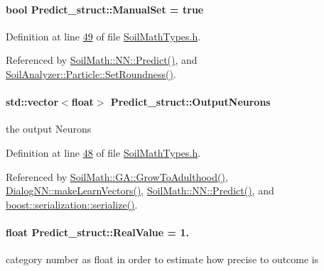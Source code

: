 \hypertarget{struct_predict__struct_a9e16b308d69246f0954a4a9100fc0660}{}
\paragraph[{Manual\+Set}]{\setlength{\rightskip}{0pt plus 5cm}bool Predict\+\_\+struct\+::\+Manual\+Set = true}\label{struct_predict__struct_a9e16b308d69246f0954a4a9100fc0660}


Definition at line \hyperlink{_soil_math_types_8h_source_l00049}{49} of file \hyperlink{_soil_math_types_8h_source}{Soil\+Math\+Types.\+h}.



Referenced by \hyperlink{_n_n_8cpp_source_l00056}{Soil\+Math\+::\+N\+N\+::\+Predict()}, and \hyperlink{particle_8cpp_source_l00089}{Soil\+Analyzer\+::\+Particle\+::\+Set\+Roundness()}.

\hypertarget{struct_predict__struct_aa0708cae93baa061f21452537e86d3bd}{}
\paragraph[{Output\+Neurons}]{\setlength{\rightskip}{0pt plus 5cm}std\+::vector$<$float$>$ Predict\+\_\+struct\+::\+Output\+Neurons}\label{struct_predict__struct_aa0708cae93baa061f21452537e86d3bd}
the output Neurons 

Definition at line \hyperlink{_soil_math_types_8h_source_l00048}{48} of file \hyperlink{_soil_math_types_8h_source}{Soil\+Math\+Types.\+h}.



Referenced by \hyperlink{_g_a_8cpp_source_l00152}{Soil\+Math\+::\+G\+A\+::\+Grow\+To\+Adulthood()}, \hyperlink{dialognn_8cpp_source_l00097}{Dialog\+N\+N\+::make\+Learn\+Vectors()}, \hyperlink{_n_n_8cpp_source_l00056}{Soil\+Math\+::\+N\+N\+::\+Predict()}, and \hyperlink{predict__t__archive_8h_source_l00025}{boost\+::serialization\+::serialize()}.

\hypertarget{struct_predict__struct_a09932ff9ac15e4b182bf6e53232eba0f}{}
\paragraph[{Real\+Value}]{\setlength{\rightskip}{0pt plus 5cm}float Predict\+\_\+struct\+::\+Real\+Value = 1.}\label{struct_predict__struct_a09932ff9ac15e4b182bf6e53232eba0f}
category number as float in order to estimate how precise to outcome is 

